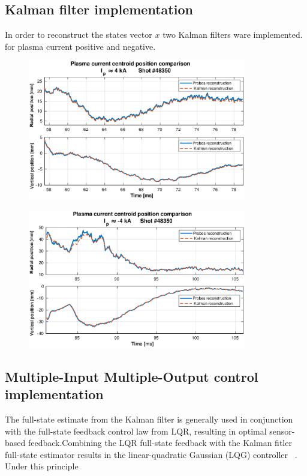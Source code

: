 \subsection{Kalman filter implementation}
In order to reconstruct the states vector $x$ two Kalman filters ware implemented.  for plasma current positive and negative.\smallskip
\begin{figure}
	\centering
	\includegraphics[width=0.85\textwidth]{Chp5/Kalman_comp_pos.eps}
	\caption{\label{Kalman_pos}}
\end{figure}

\begin{figure}
	\centering
	\includegraphics[width=0.85\textwidth]{Chp5/Kalman_comp_neg.eps}
	\caption{\label{Kalman_neg}}
\end{figure}

\subsection{Multiple-Input Multiple-Output control implementation}
	
The full-state estimate from the Kalman filter is generally used in conjunction with the
full-state feedback control law from LQR, resulting in optimal sensor-based feedback.Combining the LQR full-state feedback with the Kalman fitler full-state estimator results in the linear-quadratic Gaussian (LQG) controller ~\cite[Chapter~8]{DataDriven2019}. Under this principle 
\smallskip




